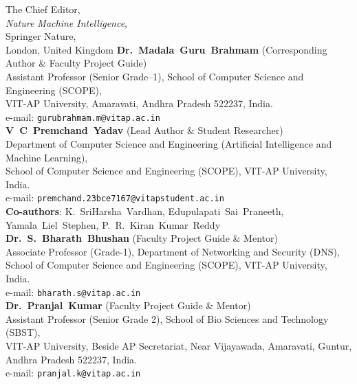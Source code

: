\documentclass[11pt]{letter}
\begin{document}
\begin{letter}{%
    The Chief Editor,\\
    \textit{Nature Machine Intelligence},\\
    Springer Nature,\\
    London, United Kingdom
}
\noindent
\textbf{Dr.~Madala~Guru~Brahmam} (Corresponding Author \& Faculty Project Guide)\\
Assistant Professor (Senior Grade--1), School of Computer Science and Engineering (SCOPE),\\
VIT-AP University, Amaravati, Andhra Pradesh 522237, India.\\
e-mail: \texttt{gurubrahmam.m@vitap.ac.in}\\[1em]
\textbf{V~C~Premchand~Yadav} (Lead Author \& Student Researcher)\\
Department of Computer Science and Engineering (Artificial Intelligence and Machine Learning),\\
School of Computer Science and Engineering (SCOPE), VIT-AP University, India.\\
e-mail: \texttt{premchand.23bce7167@vitapstudent.ac.in}\\[0.5em]
\textbf{Co-authors}: K.~SriHarsha~Vardhan, Edupulapati~Sai~Praneeth, Yamala~Liel~Stephen, P.~R.~Kiran~Kumar~Reddy\\[0.5em]
\textbf{Dr.~S.~Bharath~Bhushan} (Faculty Project Guide \& Mentor)\\
Associate Professor (Grade-1), Department of Networking and Security (DNS),\\
School of Computer Science and Engineering (SCOPE), VIT-AP University, India.\\
e-mail: \texttt{bharath.s@vitap.ac.in}\\[0.5em]
\textbf{Dr.~Pranjal~Kumar} (Faculty Project Guide \& Mentor)\\
Assistant Professor (Senior Grade 2), School of Bio Sciences and Technology (SBST),\\
VIT-AP University, Beside AP Secretariat, Near Vijayawada, Amaravati, Guntur, Andhra Pradesh 522237, India.\\
e-mail: \texttt{pranjal.k@vitap.ac.in}

\end{letter}
\end{document}
